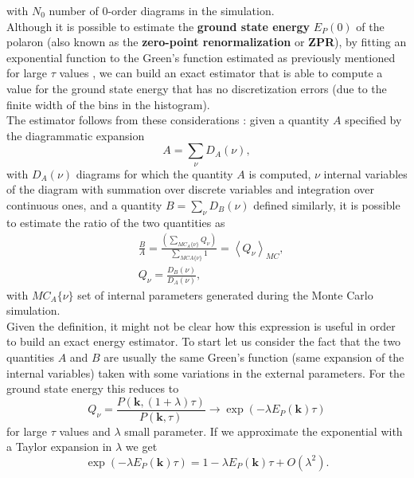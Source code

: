 with $N_0$ number of 0-order diagrams in the simulation.\\
Although it is possible to estimate the \textbf{ground state energy} $E_P(0)$ of the polaron (also known as the \textbf{zero-point renormalization} or \textbf{ZPR}), by 
fitting an exponential function to the Green's function estimated as previously mentioned for large $\tau$ values \cite{fehske2007computational}, we can build an exact estimator 
that is able to compute a value for the ground state energy that has no discretization errors (due to the finite width of the bins in the histogram).\\
The estimator follows from these considerations \cite{mishchenko2000diagrammatic}: given a quantity $A$ specified by the diagrammatic expansion 
\begin{equation}
    A=\sum_{\nu}D_A(\nu),
\end{equation}
with $D_A(\nu)$ diagrams for which the quantity $A$ is computed, $\nu$ internal variables of the diagram with summation over discrete variables and 
integration over continuous ones, and a quantity $B=\sum_{\nu}D_B(\nu)$ defined similarly, it is possible to estimate the ratio of the 
two quantities as 
\begin{equation}
\begin{split}
    &\frac{B}{A}=\frac{\left(\sum_{MC_{A}\{\nu\}}Q_\nu\right)}{\sum_{MC{A}\{\nu\}}1}=\left\langle Q_\nu \right\rangle_{MC},\\
    &Q_\nu=\frac{D_B(\nu)}{D_A(\nu)},
\end{split}
\end{equation}
with $MC_{A}\{\nu\}$ set of internal parameters generated during the Monte Carlo simulation.\\
Given the definition, it might not be clear how this expression is useful in order to build an exact energy estimator. To start let us 
consider the fact that the two quantities $A$ and $B$ are usually the same Green's function (same expansion of the internal variables) taken with some variations 
in the external parameters. For the ground state energy this reduces to
\begin{equation}
    Q_\nu=\frac{P(\mathbf{k},(1+\lambda)\tau)}{P(\mathbf{k},\tau)}\to \exp{\left(-\lambda E_P(\mathbf{k})\tau\right)}
\end{equation}
for large $\tau$ values and $\lambda$ small parameter. If we approximate the exponential with a Taylor expansion in $\lambda$ we get
\begin{equation}
    \exp{\left(-\lambda E_P(\mathbf{k})\tau\right)}=1-\lambda E_P(\mathbf{k})\tau+O(\lambda^2).
    \label{lambda_energy_estimator}
\end{equation}
